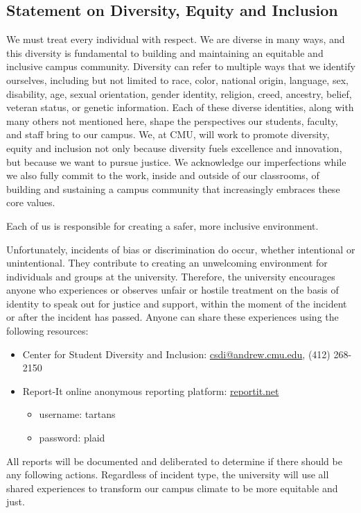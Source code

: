 \documentclass{article}
\begin{document}
\subsection*{Statement on Diversity, Equity and Inclusion}

We must treat every individual with respect. We are diverse in many ways, and
this diversity is fundamental to building and maintaining an equitable and
inclusive campus community. Diversity can refer to multiple ways that we
identify ourselves, including but not limited to race, color, national origin,
language, sex, disability, age, sexual orientation, gender identity, religion,
creed, ancestry, belief, veteran status, or genetic information. Each of these
diverse identities, along with many others not mentioned here, shape the
perspectives our students, faculty, and staff bring to our campus. We, at CMU,
will work to promote diversity, equity and inclusion not only because diversity
fuels excellence and innovation, but because we want to pursue justice. We
acknowledge our imperfections while we also fully commit to the work, inside and
outside of our classrooms, of building and sustaining a campus community that
increasingly embraces these core values.

Each of us is responsible for creating a safer, more inclusive environment.

Unfortunately, incidents of bias or discrimination do occur, whether intentional
or unintentional. They contribute to creating an unwelcoming environment for
individuals and groups at the university. Therefore, the university encourages
anyone who experiences or observes unfair or hostile treatment on the basis of
identity to speak out for justice and support, within the moment of the incident
or after the incident has passed. Anyone can share these experiences using the
following resources:

\begin{itemize}
    \item Center for Student Diversity and Inclusion:
        \href{mailto:csdi@andrew.cmu.edu}{csdi@andrew.cmu.edu},
        (412) 268-2150
    \item Report-It online anonymous reporting platform: \url{reportit.net}
    \begin{itemize}
        \item username: tartans
        \item password: plaid
    \end{itemize}
\end{itemize}

All reports will be documented and deliberated to determine if there should be
any following actions. Regardless of incident type, the university will use all
shared experiences to transform our campus climate to be more equitable and
just.

\end{document}
